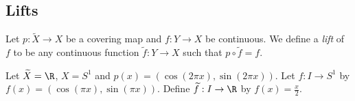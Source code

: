 \subsection{Lifts}
\begin{definition}
Let $p:\widetilde{X}\rightarrow X$ be a covering map and $f:Y\rightarrow X$ be continuous. We define a \textit{lift} of $f$ to be any continuous function $\widetilde{f}:Y\rightarrow X$ such that $p\circ \widetilde{f}=f$.
\end{definition}

\begin{example}
Let $\widetilde{X}=\R$, $X=S^1$ and $p(x)=\left(\cos(2\pi x),\sin(2\pi x)\right)$. Let $f:I\rightarrow S^1$ by $f(x)=\left(\cos(\pi x),\sin(\pi x)\right)$. Define $\widetilde{f}:I\rightarrow \R$ by $f(x)=\frac{x}{2}$.
\placeholder
\end{example}

